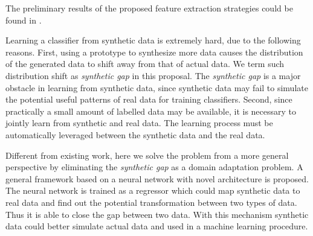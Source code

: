 \documentclass{iitthesis}
\begin{document}
The preliminary results of the proposed feature extraction strategies could be found in \cite{Zhang2014Autoencoder}\cite{AndiZang2015}\cite{ZX:14}.

%

 Learning a classifier from synthetic data is extremely hard, due to the following reasons. First, using a prototype to synthesize more data causes the distribution of the generated data to shift away from that of actual data. We term such distribution shift as \textit{synthetic gap} in this proposal. The \textit{synthetic gap} is a major obstacle in learning from synthetic data, since synthetic data may fail to simulate the potential useful patterns of real data for training classifiers. Second, since practically a small amount of labelled data may be available, it is necessary to jointly learn from synthetic and real data. The learning process must be automatically leveraged between the synthetic data and the real data. 

Different from existing work, here we solve the problem from a more general perspective by eliminating the \textit{synthetic gap} as a domain adaptation problem. A general framework based on a neural network with novel architecture is proposed. The neural network is trained as a regressor which could map synthetic data to real data and find out the potential transformation between two types of data. Thus it is able to close the gap between two data. With this mechanism synthetic data could better simulate actual data and used in a machine learning procedure.
\end{document}
